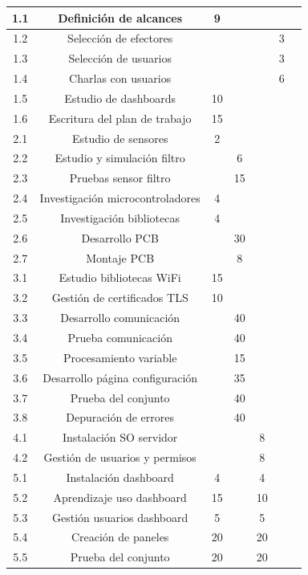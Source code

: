 \documentclass[11pt]{charter}
\begin{document}
\begin{table}
{\begin{tabular}{|c|c|c|c|c|c|c|}
 1.1&Definición de alcances & 9 & &  &  &  \\ \hline
 1.2&Selección de efectores &  &  &  & 3 &  \\ \hline
 1.3&Selección de usuarios  &  &  &  & 3 &\\ \hline
 1.4&Charlas con usuarios  &  &  &  & 6 &\\ \hline
 1.5&Estudio de dashboards & 10 &  &  &  &\\ \hline
 1.6&Escritura del plan de trabajo & 15 &  &  &  &\\ \hline
 2.1&Estudio de sensores  & 2 &  &  &  &\\ \hline
 2.2&Estudio y simulación filtro  &  & 6 &  &  &\\ \hline 
 2.3&Pruebas sensor filtro  &  & 15 &  &  &\\ \hline
 2.4&Investigación microcontroladores  & 4 &  &  &  &\\ \hline
 2.5&Investigación bibliotecas  & 4 &  &  &  &\\ \hline
 2.6&Desarrollo PCB  &  & 30 &  &  &\\ \hline
 2.7&Montaje PCB  &  & 8 &  &  &\\ \hline
  3.1&Estudio bibliotecas WiFi & 15 &  &  &  &\\ \hline
 3.2&Gestión de certificados TLS  & 10 &  &  &  &\\ \hline
 3.3&Desarrollo comunicación  &  & 40 &  &  &\\ \hline
 3.4&Prueba comunicación  &  & 40 &  &  &\\ \hline
 3.5&Procesamiento variable  &  & 15 &  &  &\\ \hline
 3.6&Desarrollo página configuración &  & 35 &  &  &\\ \hline
 3.7&Prueba del conjunto  &  & 40 &  &  &\\ \hline
 3.8&Depuración de errores  &  & 40 &  &  &\\ \hline
 4.1&Instalación SO servidor  &  &  & 8 &  &\\ \hline
 4.2&Gestión de usuarios y permisos &  &  & 8 &  &\\ \hline
 5.1&Instalación dashboard  & 4 &  & 4 &  &\\ \hline 
 5.2&Aprendizaje uso dashboard  & 15 &  & 10 &  &\\ \hline
 5.3&Gestión usuarios dashboard  & 5 &  & 5 &  &\\ \hline
 5.4&Creación de paneles  & 20 &  & 20 &  &\\ \hline
 5.5&Prueba del conjunto  & 20 &  & 20 &  &\\ \hline

\end{tabular}}
\end{table}
\end{document}
